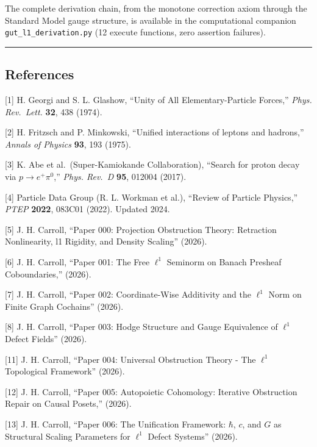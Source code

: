 \documentclass[
]{article}
\begin{document}
The complete derivation chain, from the monotone correction axiom
through the Standard Model gauge structure, is available in the
computational companion \texttt{gut\_l1\_derivation.py} (12 execute
functions, zero assertion failures).

\begin{center}\rule{0.5\linewidth}{0.5pt}\end{center}

\hypertarget{references}{%
\subsection{References}\label{references}}

{[}1{]} H. Georgi and S. L. Glashow, ``Unity of All Elementary-Particle
Forces,'' \emph{Phys. Rev.~Lett.} \textbf{32}, 438 (1974).

{[}2{]} H. Fritzsch and P. Minkowski, ``Unified interactions of leptons
and hadrons,'' \emph{Annals of Physics} \textbf{93}, 193 (1975).

{[}3{]} K. Abe et al.~(Super-Kamiokande Collaboration), ``Search for
proton decay via \(p \to e^+\pi^0\),'' \emph{Phys. Rev.~D} \textbf{95},
012004 (2017).

{[}4{]} Particle Data Group (R. L. Workman et al.), ``Review of Particle
Physics,'' \emph{PTEP} \textbf{2022}, 083C01 (2022). Updated 2024.

{[}5{]} J. H. Carroll, ``Paper 000: Projection Obstruction Theory:
Retraction Nonlinearity, l1 Rigidity, and Density Scaling'' (2026).

{[}6{]} J. H. Carroll, ``Paper 001: The Free \(\ell^1\) Seminorm on
Banach Presheaf Coboundaries,'' (2026).

{[}7{]} J. H. Carroll, ``Paper 002: Coordinate-Wise Additivity and the
\(\ell^1\) Norm on Finite Graph Cochains'' (2026).

{[}8{]} J. H. Carroll, ``Paper 003: Hodge Structure and Gauge
Equivalence of \(\ell^1\) Defect Fields'' (2026).

{[}11{]} J. H. Carroll, ``Paper 004: Universal Obstruction Theory - The
\(\ell^1\) Topological Framework'' (2026).

{[}12{]} J. H. Carroll, ``Paper 005: Autopoietic Cohomology: Iterative
Obstruction Repair on Causal Posets,'' (2026).

{[}13{]} J. H. Carroll, ``Paper 006: The Unification Framework:
\(\hbar\), \(c\), and \(G\) as Structural Scaling Parameters for
\(\ell^1\) Defect Systems'' (2026).
\end{document}
